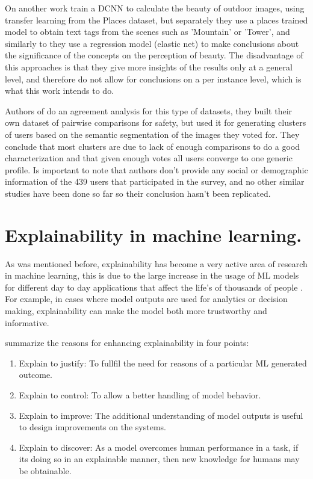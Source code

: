 On another work  train a DCNN to calculate the beauty of outdoor images,
using transfer learning from the Places dataset, but separately they use a places trained model to obtain text tags from
the scenes such as 'Mountain' or 'Tower', and similarly to  they use a regression model
(elastic net) to make conclusions about the significance of the concepts on the perception of beauty. The disadvantage
of this approaches is that they give more insights of the results only at a general level, and therefore do not allow for
conclusions on a per instance level, which is what this work intends to do.

Authors of  do an agreement analysis for this type of datasets,
they built their own dataset of pairwise comparisons for safety, but used it
for  generating clusters of users based on the semantic segmentation of the images they voted for.
They conclude that most clusters are due to lack of enough comparisons to do a good characterization
and that given enough votes all users converge to one generic profile. Is important to note
that authors don't provide any social or demographic information of the 439 users that
participated in the survey, and no other similar studies have been done so
far so their conclusion hasn't been replicated.

\section{ Explainability in machine learning.}

As was mentioned before, explainability has become a very active area of research
in machine learning, this is due to the large increase in the usage of ML models
for different day to day applications that affect the life's of thousands of people
\cite{ras_explanation}. For example, in cases where model outputs are used for analytics or decision
making, explainability can make the model both more trustworthy and informative.

 summarize the reasons for enhancing explainability in four points:

\begin{enumerate}
	\item Explain to justify: To fullfil the need for reasons of a particular ML
	generated outcome.
	\item Explain to control: To allow a better handling of model behavior.
	\item Explain to improve: The additional understanding of model outputs is useful
	to design improvements on the systems.
	\item Explain to discover: As a model overcomes human performance in a task, if its
	doing so in an explainable manner, then new knowledge for humans may be obtainable.

\end{enumerate}

